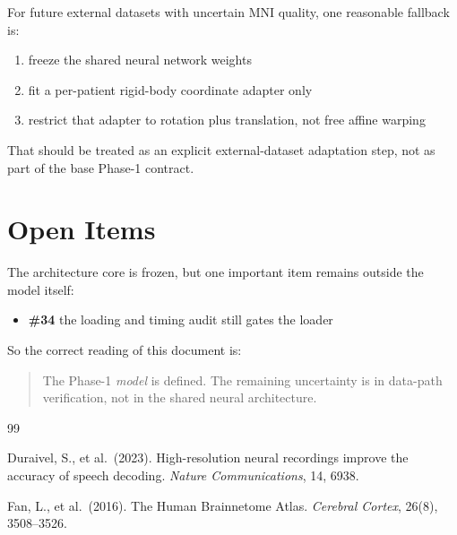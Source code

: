 \documentclass[11pt,letterpaper]{article}
\begin{document}
For future external datasets with uncertain MNI quality, one reasonable fallback is:
\begin{enumerate}[leftmargin=2em, itemsep=0.2em]
\item freeze the shared neural network weights
\item fit a per-patient rigid-body coordinate adapter only
\item restrict that adapter to rotation plus translation, not free affine warping
\end{enumerate}

That should be treated as an explicit external-dataset adaptation step, not as part of the base Phase-1 contract.


\section{Open Items}

The architecture core is frozen, but one important item remains outside the model itself:
\begin{itemize}[leftmargin=2em, itemsep=0.2em]
\item \textbf{\#34} the loading and timing audit still gates the loader
\end{itemize}

So the correct reading of this document is:
\begin{quote}
The Phase-1 \emph{model} is defined. The remaining uncertainty is in data-path verification, not in the shared neural architecture.
\end{quote}


\begin{thebibliography}{99}\raggedright

Duraivel, S., et al.\ (2023).
High-resolution neural recordings improve the accuracy of speech decoding.
\textit{Nature Communications}, 14, 6938.

Fan, L., et al.\ (2016).
The Human Brainnetome Atlas.
\textit{Cerebral Cortex}, 26(8), 3508--3526.

\end{thebibliography}
\end{document}
